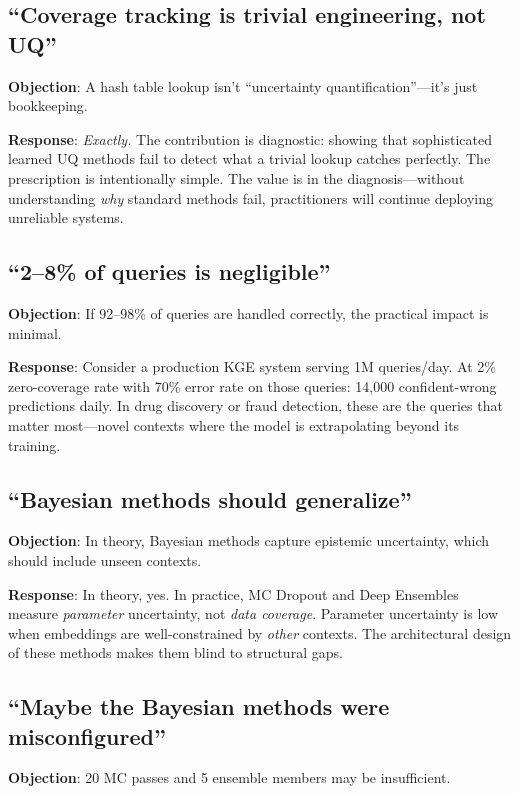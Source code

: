 \documentclass{article}
\begin{document}
\subsection{``Coverage tracking is trivial engineering, not UQ''}

\textbf{Objection}: A hash table lookup isn't ``uncertainty quantification''---it's just bookkeeping.

\textbf{Response}: \emph{Exactly.} The contribution is diagnostic: showing that sophisticated learned UQ methods fail to detect what a trivial lookup catches perfectly. The prescription is intentionally simple. The value is in the diagnosis---without understanding \emph{why} standard methods fail, practitioners will continue deploying unreliable systems.

\subsection{``2--8\% of queries is negligible''}

\textbf{Objection}: If 92--98\% of queries are handled correctly, the practical impact is minimal.

\textbf{Response}: Consider a production KGE system serving 1M queries/day. At 2\% zero-coverage rate with 70\% error rate on those queries: 14,000 confident-wrong predictions daily. In drug discovery or fraud detection, these are the queries that matter most---novel contexts where the model is extrapolating beyond its training.

\subsection{``Bayesian methods should generalize''}

\textbf{Objection}: In theory, Bayesian methods capture epistemic uncertainty, which should include unseen contexts.

\textbf{Response}: In theory, yes. In practice, MC Dropout and Deep Ensembles measure \emph{parameter} uncertainty, not \emph{data coverage}. Parameter uncertainty is low when embeddings are well-constrained by \emph{other} contexts. The architectural design of these methods makes them blind to structural gaps.

\subsection{``Maybe the Bayesian methods were misconfigured''}

\textbf{Objection}: 20 MC passes and 5 ensemble members may be insufficient.
\end{document}
